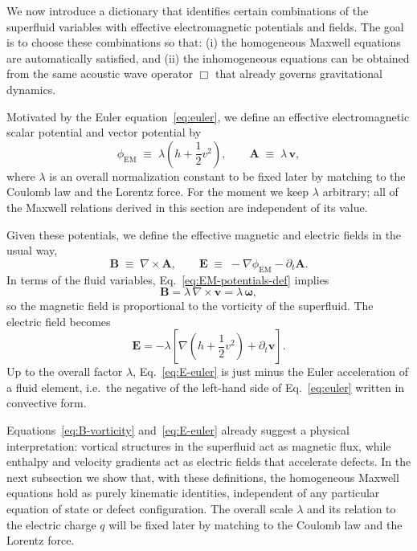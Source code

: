 \documentclass[11pt]{article}
\begin{document}
We now introduce a dictionary that identifies certain combinations of the superfluid variables with effective electromagnetic potentials and fields.  The goal is to choose these combinations so that:
(i) the homogeneous Maxwell equations are automatically satisfied, and
(ii) the inhomogeneous equations can be obtained from the same acoustic wave operator $\Box$ that already governs gravitational dynamics.

Motivated by the Euler equation~\eqref{eq:euler}, we define an effective electromagnetic scalar potential and vector potential by
\begin{equation}
\phi_{\mathrm{EM}} \;\equiv\; \lambda \left(h + \frac{1}{2} v^2\right),
\qquad
\mathbf{A} \;\equiv\; \lambda\,\mathbf{v},
\label{eq:EM-potentials-def}
\end{equation}
where $\lambda$ is an overall normalization constant to be fixed later by matching to the Coulomb law and the Lorentz force.  For the moment we keep $\lambda$ arbitrary; all of the Maxwell relations derived in this section are independent of its value.

Given these potentials, we define the effective magnetic and electric fields in the usual way,
\begin{equation}
\mathbf{B} \;\equiv\; \nabla \times \mathbf{A},
\qquad
\mathbf{E} \;\equiv\; -\nabla \phi_{\mathrm{EM}} - \partial_t \mathbf{A}.
\label{eq:EB-def}
\end{equation}
In terms of the fluid variables, Eq.~\eqref{eq:EM-potentials-def} implies
\begin{equation}
\mathbf{B} = \lambda\,\nabla \times \mathbf{v} = \lambda\,\boldsymbol{\omega},
\label{eq:B-vorticity}
\end{equation}
so the magnetic field is proportional to the vorticity of the superfluid.  The electric field becomes
\begin{equation}
\mathbf{E}
= -\lambda \left[\nabla\!\left(h + \frac{1}{2}v^2\right)
               + \partial_t \mathbf{v}\right].
\label{eq:E-euler}
\end{equation}
Up to the overall factor $\lambda$, Eq.~\eqref{eq:E-euler} is just minus the Euler acceleration of a fluid element, i.e.\ the negative of the left-hand side of Eq.~\eqref{eq:euler} written in convective form.

Equations~\eqref{eq:B-vorticity} and~\eqref{eq:E-euler} already suggest a physical interpretation: vortical structures in the superfluid act as magnetic flux, while enthalpy and velocity gradients act as electric fields that accelerate defects.  In the next subsection we show that, with these definitions, the homogeneous Maxwell equations hold as purely kinematic identities, independent of any particular equation of state or defect configuration.  The overall scale $\lambda$ and its relation to the electric charge $q$ will be fixed later by matching to the Coulomb law and the Lorentz force.
\end{document}
